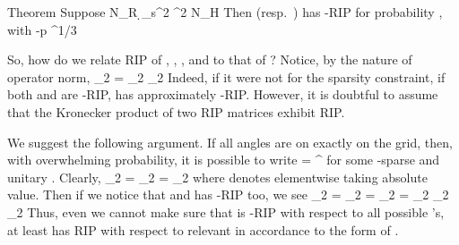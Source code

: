 \Result
{Theorem}
{
Suppose
%
 {
\NC N_R
\geq \NC {} {\d_s^2} ^2 \log N_H \NR
}
%
Then  (resp.\ ) has -RIP for probability , with
 {
 -p
\leq \NC {} ^{1/3} \NR
}
}

\stopsubsection

\startsubsection [title={Confirming the restricted isometry}]

So, how do we relate RIP of , , , and  to that of ?
Notice, by the nature of operator norm,
 {
\NC {} _2
=\NC {} _2  _2 \NR
}
Indeed, if it were not for the sparsity constraint, if both  and  are -RIP,  has approximately -RIP.
However, it is doubtful to assume that the Kronecker product of two RIP matrices exhibit RIP.

We suggest the following argument.
If all angles  are on exactly on the grid, then, with overwhelming probability, it is possible to write
 {
\NC {}
=\NC {}    ^\Adj \NR
}
for some -sparse  and unitary .
Clearly,
 {
\NC {} _2
=\NC {} _2 \NR
%
\NC =\NC {} _2 \NR
}
where  denotes elementwise taking absolute value.
Then if we notice that  and  has -RIP too, we see
 {
\NC \NC {} _2 \NR
%
\NC =\NC {} _2 \NR
%
\NC =\NC {} _2 \NR
%
\NC =\NC {} _2 \D
    _2 \NR
%
\NC \eqsim \NC {} _2  \NR
}
Thus, even we cannot make sure that  is -RIP with respect to all possible 's, at least  has RIP with respect to relevant  in accordance to the form of .

\stopsubsection

\stopsection
